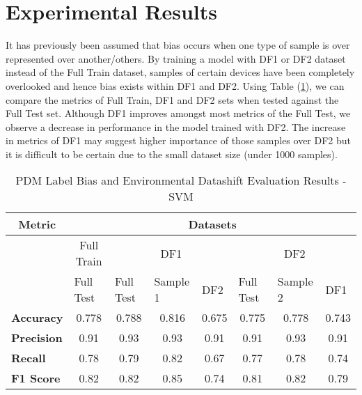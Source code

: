 \section{Experimental Results}
It has previously been assumed that bias occurs when one type of sample is over represented over another/others.
By training a model with DF1 or DF2 dataset instead of the Full Train dataset, samples of certain devices have been completely overlooked and hence bias exists within DF1 and DF2. 
Using Table (\ref{table:Bias}), we can compare the metrics of Full Train, DF1 and DF2 sets when tested against the Full Test set.
Although DF1 improves amongst most metrics of the Full Test, we observe a decrease in performance in the model trained with DF2.
The increase in metrics of DF1 may suggest higher importance of those samples over DF2 but it is difficult to be certain due to the small dataset size (under 1000 samples).

\bigskip
\begin{table}[H]
    \begin{center}
        \caption{PDM Label Bias and Environmental Datashift Evaluation Results - SVM}
        \label{table:Bias}
        \begin{tabular}{lccccccc}
            \toprule
            \multicolumn{1}{c}{\textbf{Metric}} & \multicolumn{7}{c}{\textbf{Datasets}}                                                                                                                                                                                                      \\ \midrule
            \multicolumn{1}{l}{}      & \multicolumn{1}{c|}{Full Train} & \multicolumn{3}{c|}{DF1}                                                                       & \multicolumn{3}{c}{DF2}                                                                       \\ \cline{2-8} 
            \multicolumn{1}{l}{}      & \multicolumn{1}{l|}{Full Test}  & \multicolumn{1}{l|}{Full Test} & \multicolumn{1}{l|}{Sample 1} & \multicolumn{1}{l|}{DF2} & \multicolumn{1}{l|}{Full Test} & \multicolumn{1}{l|}{Sample 2} & \multicolumn{1}{l}{DF1} \\ 
            \midrule
            \textbf{Accuracy}   & 0.778 &0.788  &0.816  &0.675  &0.775      &0.778  &0.743\\
            \textbf{Precision}  &0.91   &0.93   &0.93   &0.91   &0.91       &0.93   &0.91\\
            \textbf{Recall}     &0.78   &0.79   &0.82   &0.67   &0.77       &0.78   &0.74\\
            \textbf{F1 Score}   &0.82   &0.82   &0.85   &0.74   &0.81       &0.82   &0.79\\
            \bottomrule
        \end{tabular}
    \end{center}
\end{table}

